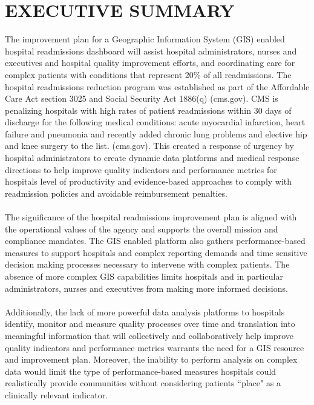 \documentclass[11pt]{article}\usepackage[]{graphicx}\usepackage[]{color}
\begin{document}
\newpage

\section{EXECUTIVE SUMMARY}

The improvement plan for a Geographic Information System (GIS) enabled hospital readmissions dashboard will assist hospital administrators, nurses and executives and hospital quality improvement efforts, and coordinating care for complex patients with conditions that represent 20\% of all readmissions. The hospital readmissions reduction program was established as part of the Affordable Care Act section 3025 and Social Security Act 1886(q) (cms.gov). CMS is penalizing hospitals with high rates of patient readmissions within 30 days of discharge for the following medical conditions: acute myocardial infarction, heart failure and pneumonia and recently added chronic lung problems and elective hip and knee surgery to the list. (cms.gov). This created a response of urgency by hospital administrators to create dynamic data platforms and medical response directions to help improve quality indicators and performance metrics for hospitals level of productivity and evidence-based approaches to comply with readmission policies and avoidable reimbursement penalties.
\paragraph{}
The significance of the hospital readmissions improvement plan is aligned with the operational values of the agency and supports the overall mission and compliance mandates. The GIS enabled platform also gathers performance-based measures to support hospitals and complex reporting demands and time sensitive decision making processes necessary to intervene with complex patients. The absence of more complex GIS capabilities limits hospitals and in particular administrators, nurses and executives from making more informed decisions. 
\paragraph{}
Additionally, the lack of more powerful data analysis platforms to hospitals identify, monitor and measure quality processes over time and translation into meaningful information that will collectively and collaboratively help improve quality indicators and performance metrics warrants the need for a GIS resource and improvement plan. Moreover, the inability to perform analysis on complex data would limit the type of performance-based measures hospitals could realistically provide communities without considering patients ``place" as a clinically relevant indicator.
\end{document}
